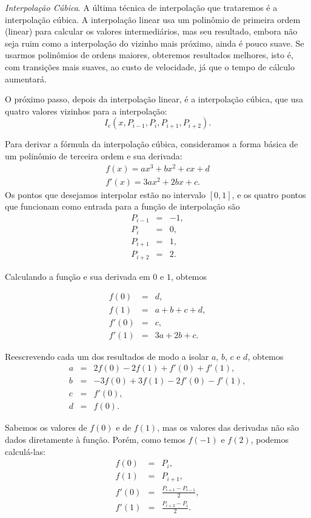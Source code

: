 \emph{Interpolação Cúbica}. A última técnica de interpolação que trataremos é a interpolação cúbica. A interpolação linear usa um polinômio de primeira ordem (linear) para calcular os valores intermediários, mas seu resultado, embora não seja ruim como a interpolação do vizinho mais próximo, ainda é pouco suave. Se usarmos polinômios de ordens maiores, obteremos resultados melhores, isto é, com transições mais suaves, ao custo de velocidade, já que o tempo de cálculo aumentará. 

O próximo passo, depois da interpolação linear, é a interpolação cúbica, que usa quatro valores vizinhos para a interpolação:
\[
 I_{c} (x, P_{i-1}, P_{i}, P_{i+1}, P_{i+2}).
\]  

Para derivar a fórmula da interpolação cúbica, consideramos a forma básica de um polinômio de terceira ordem e sua derivada:
\[
\begin{array}{l}
	f(x) = ax^3 + bx^2 + cx + d \\
f'(x) = 3ax^2 + 2bx + c.
\end{array}
\]
Os pontos que desejamos interpolar estão no intervalo $[0, 1]$, e os quatro pontos que funcionam como entrada para a função de interpolação são
\[
\begin{array}{rcl}
P_{i-1} & = & -1, \\
P_{i} & = & 0, \\
P_{i+1} & = & 1, \\
P_{i+2} & = & 2.
\end{array} 
\]

Calculando a função e sua derivada em $0$ e $1$, obtemos

\[
\begin{array}{rcl}
f(0) & = & d, \\
f(1) & = & a + b + c + d, \\
f'(0) & = & c, \\
f'(1) & = & 3a + 2b + c.
\end{array} 
\]

Reescrevendo cada um dos resultados de modo a isolar $a$, $b$, $c$ e $d$, obtemos
\[
\begin{array}{rcl}
a & = & 2f(0) - 2f(1) + f'(0) + f'(1), \\
b & = & -3f(0) + 3f(1) - 2f'(0) - f'(1), \\
c & = & f'(0), \\
d & = & f(0).
\end{array} 
\]

Sabemos os valores de $f(0)$ e de $f(1)$, mas os valores das derivadas não são dados diretamente à função. Porém, como temos $f(-1)$ e $f(2)$, podemos calculá-las:
\[
\begin{array}{rcl}
f(0) & = & P_{i}, \\
f(1) & = & P_{i+1}, \\
f'(0) & = & \frac{P_{i+1} - P_{i-1}}{2}, \\
f'(1) & = & \frac{P_{i+2} - P_{i}}{2}.
\end{array} 
\]

